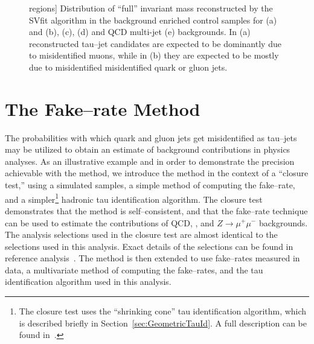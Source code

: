\begin{figure}
\begin{center}
regions]{\captiontext 
	 Distribution of ``full'' invariant mass reconstructed by the SVfit algorithm
         in the background enriched control samples for 
         \ZMM (a) and (b), \WpJets (c), \ttbarpJets (d) and QCD multi-jet (e) backgrounds.
         In (a) reconstructed tau--jet candidates are expected to be dominantly due to misidentified muons,
         while in (b) they are expected to be mostly due to misidentified misidentified quark or gluon jets.}
\label{fig:SVfitMassMuTauBgControlRegions}
\end{center}
\end{figure} 

\section{The Fake--rate Method}
\label{sec:fakerate}
%
The probabilities with which quark and gluon jets get misidentified as tau--jets
may be utilized to obtain an estimate of background contributions in physics
analyses.  As an illustrative example and in order to demonstrate the precision
achievable with the method, we introduce the method in the context of a
``closure test,'' using a simulated samples, a simple method of computing the
fake--rate, and a simpler\footnote{The closure test uses the ``shrinking cone''
tau identification algorithm, which is described briefly in
Section~\ref{sec:GeometricTauId}. A full description can be found
in~\cite{CMS-PAS-PFT-08-001}.} hadronic tau identification algorithm.  The
closure test demonstrates that the method is self--consistent, and that the
fake--rate technique can be used to estimate the contributions of QCD, \WpJets,
\ttbarpJets and $Z \rightarrow \mu^{+} \mu^{-}$ backgrounds.   The analysis
selections used in the closure test are almost identical to the selections used
in this analysis.  Exact details of the selections can be found in reference
analysis~\cite{CMS-PAS-EWK-10-002}.  The method is then extended to use
fake--rates measured in data, a multivariate method of computing the
fake--rates, and the \hpsTanc tau identification algorithm used in this
analysis.

